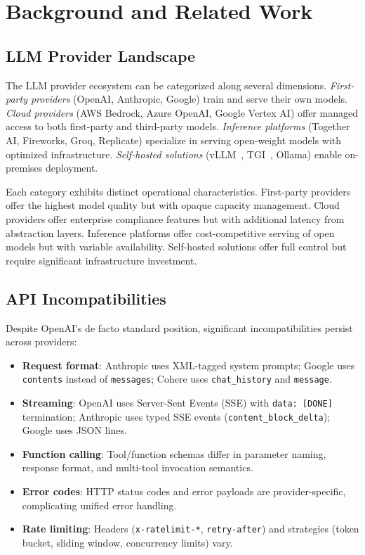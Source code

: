 \section{Background and Related Work}

\label{sec:background}

\subsection{LLM Provider Landscape}

The LLM provider ecosystem can be categorized along several dimensions. \textit{First-party providers} (OpenAI, Anthropic, Google) train and serve their own models. \textit{Cloud providers} (AWS Bedrock, Azure OpenAI, Google Vertex AI) offer managed access to both first-party and third-party models. \textit{Inference platforms} (Together AI, Fireworks, Groq, Replicate) specialize in serving open-weight models with optimized infrastructure. \textit{Self-hosted solutions} (vLLM~\cite{kwon2023vllm}, TGI~\cite{tgi2023}, Ollama) enable on-premises deployment.

Each category exhibits distinct operational characteristics. First-party providers offer the highest model quality but with opaque capacity management. Cloud providers offer enterprise compliance features but with additional latency from abstraction layers. Inference platforms offer cost-competitive serving of open models but with variable availability. Self-hosted solutions offer full control but require significant infrastructure investment.

\subsection{API Incompatibilities}

Despite OpenAI's de facto standard position, significant incompatibilities persist across providers:

\begin{itemize}[leftmargin=*]
    \item \textbf{Request format}: Anthropic uses XML-tagged system prompts; Google uses \texttt{contents} instead of \texttt{messages}; Cohere uses \texttt{chat\_history} and \texttt{message}.
    \item \textbf{Streaming}: OpenAI uses Server-Sent Events (SSE) with \texttt{data: [DONE]} termination; Anthropic uses typed SSE events (\texttt{content\_block\_delta}); Google uses JSON lines.
    \item \textbf{Function calling}: Tool/function schemas differ in parameter naming, response format, and multi-tool invocation semantics.
    \item \textbf{Error codes}: HTTP status codes and error payloads are provider-specific, complicating unified error handling.
    \item \textbf{Rate limiting}: Headers (\texttt{x-ratelimit-*}, \texttt{retry-after}) and strategies (token bucket, sliding window, concurrency limits) vary.
\end{itemize}

